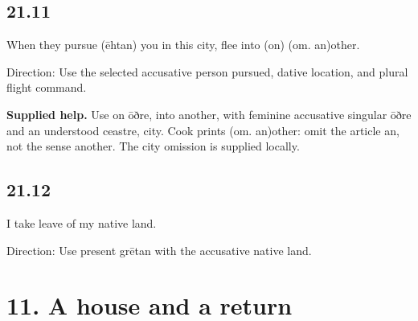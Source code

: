 \subsection*{21.11}

\par\begin{minipage}{\linewidth}\raggedright
When they pursue (ēhtan) you in this city, flee into (on) (om. an)other.

Direction: Use the selected accusative person pursued, dative location, and plural flight command.

\end{minipage}\par\addvspace{4pt}

\textbf{Supplied help.} Use on ōðre, into another, with feminine accusative singular ōðre and an understood ceastre, city. Cook prints (om. an)other: omit the article an, not the sense another. The city omission is supplied locally.

\subsection*{21.12}

\par\begin{minipage}{\linewidth}\raggedright
I take leave of my native land.

Direction: Use present grētan with the accusative native land.

\end{minipage}\par\addvspace{4pt}

\section*{11. A house and a return}

